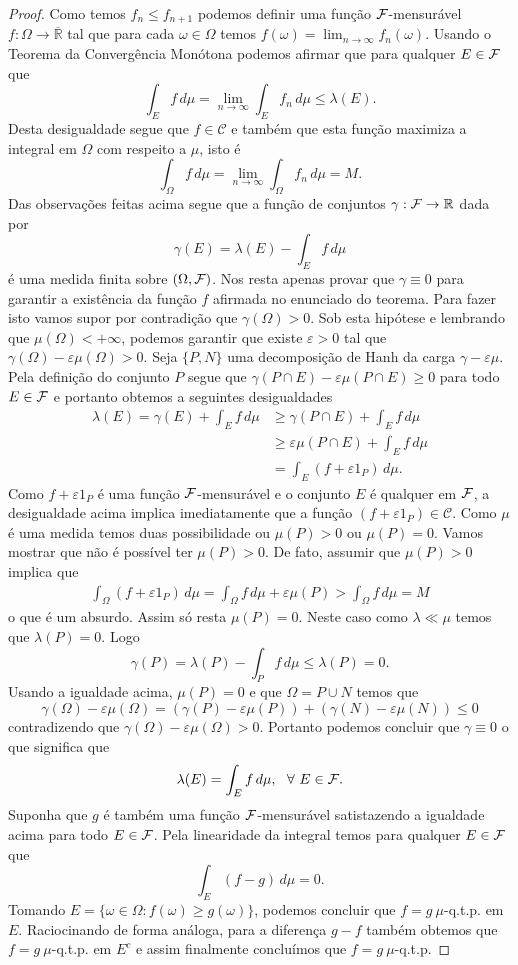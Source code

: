 \begin{proof}
Como temos $f_n\leq f_{n+1}$ podemos definir uma função
$\mathcal{F}$-mensurável  $f:\Omega\to\overline{\mathbb{R}}$ tal que
para cada $\omega\in\Omega$ temos
$f(\omega) =\lim_{n\to\infty} f_n(\omega)$.
Usando o Teorema da Convergência Monótona podemos afirmar que 
para qualquer $E\in\mathcal{F}$ que 
\[
\int_{E} f\, d\mu
=
\lim_{n\to\infty}
\int_{E} f_n\, d\mu
\leq
\lambda(E).
\]
Desta desigualdade segue que $f\in\mathscr{C}$ e 
também que esta função maximiza a integral em $\Omega$
com respeito a $\mu$, isto é 
\[
\int_{\Omega} f\, d\mu 
=
\lim_{n\to\infty}
\int_{\Omega} f_n\, d\mu
=
M.
\]
Das observações feitas acima segue que a função de
conjuntos $\gamma:\mathcal{F}\to\mathbb{R}$ dada por 
\[
\gamma(E) 
=
\lambda(E) - \int_{E} f\, d\mu 
\]
é uma medida finita sobre $(\Omega,\mathcal{F})$.
Nos resta apenas provar que $\gamma \equiv 0$
para garantir a existência da função $f$ afirmada
no enunciado do teorema.
Para fazer isto vamos supor 
por contradição que $\gamma(\Omega)>0$.
Sob esta hipótese e lembrando que $\mu(\Omega)<+\infty$, 
podemos garantir que existe $\varepsilon>0$ 
tal que $\gamma(\Omega)-\varepsilon \mu(\Omega)>0$.
Seja $\{P,N\}$ uma decomposição de Hanh da carga 
$\gamma-\varepsilon\mu$. Pela definição do conjunto 
$P$ segue que $\gamma(P\cap E)-\varepsilon\mu(P\cap E)\geq 0$
para todo $E\in \mathcal{F}$ e portanto obtemos a seguintes 
desigualdades
\begin{align*}
\lambda(E) 
= 
\gamma(E)+\int_{E} f\, d\mu
&\geq 
\gamma(P\cap E)+\int_{E} f\, d\mu
\\
&\geq
\varepsilon \mu(P\cap E)+\int_{E} f\, d\mu
\\
&=
\int_{E} (f+\varepsilon 1_{P})\, d\mu.
\end{align*}
Como $f+\varepsilon 1_{P}$ é uma função $\mathcal{F}$-mensurável
e o conjunto $E$ é qualquer em $\mathcal{F}$, 
a desigualdade acima implica imediatamente que
a função $(f+\varepsilon 1_{P})\in \mathscr{C}$.
Como $\mu$ é uma medida temos duas possibilidade
ou $\mu(P)>0$ ou $\mu(P)=0$. Vamos mostrar que 
não é possível ter $\mu(P)>0$. 
De fato, assumir que $\mu(P)>0$ implica que 
%
\begin{align*}
\int_{\Omega}  
(f+\varepsilon 1_{P})\, d\mu
=
\int_{\Omega} f\, d\mu
+
\varepsilon\mu(P)
>
\int_{\Omega} f\, d\mu
=
M
\end{align*}
o que é um absurdo. Assim só resta $\mu(P)=0$.
Neste caso como $\lambda\ll \mu$ temos que 
$\lambda(P)=0$. Logo 
\[
\gamma(P) 
= 
\lambda(P)-\int_{P} f\, d\mu
\leq 
\lambda(P)
=
0.
\]
Usando a igualdade acima, $\mu(P)=0$ e que $\Omega = P\cup N$ 
temos que 
\[
\gamma(\Omega)-\varepsilon\mu(\Omega)
=
(\gamma(P)-\varepsilon\mu(P))
+
(\gamma(N)-\varepsilon\mu(N))
\leq 
0
\]
contradizendo que $\gamma(\Omega)-\varepsilon\mu(\Omega)>0$.
Portanto podemos concluir que $\gamma\equiv 0$ o 
que significa que 
\[
\lambda(E)
=
\int_E f\, d\mu,
\ \ \forall\ E\in\mathcal{F}.
\]
Suponha que $g$ é também uma função $\mathcal{F}$-mensurável
satistazendo a igualdade acima para todo $E\in \mathcal{F}$.
Pela linearidade da integral temos para qualquer 
$E\in \mathcal{F}$ que 
\[
\int_E (f-g)\, d\mu = 0.
\]
Tomando $E=\{\omega\in\Omega: f(\omega)\geq g(\omega)\}$,
podemos concluir que $f=g \ \mu$-q.t.p. em $E$.
Raciocinando de forma análoga, para a diferença $g-f$ 
também obtemos que $f=g \ \mu$-q.t.p. em $E^c$ e 
assim finalmente concluímos que $f=g \ \mu$-q.t.p.


\end{proof}
